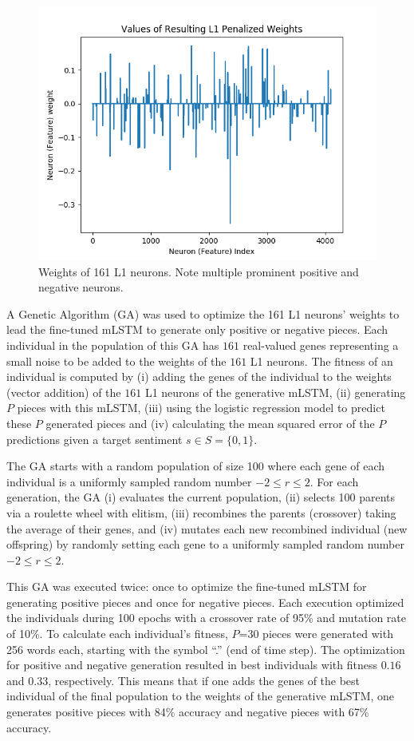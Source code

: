 \begin{figure}[!h]
 \centering
 \includegraphics[width=\columnwidth]{imgs/ismir19/weights.png}
 \caption{Weights of 161 L1 neurons. Note multiple prominent positive and negative neurons.}
 \label{fig:final_weights}
\end{figure}

A Genetic Algorithm (GA) was used to optimize the 161 L1 neurons' weights to lead the fine-tuned mLSTM to generate only positive or negative pieces. Each individual in the population of this GA has $161$ real-valued genes representing a small noise to be added to the weights of the $161$ L1 neurons. The fitness of an individual is computed by (i) adding the genes of the individual to the weights (vector addition) of the $161$ L1 neurons of the generative mLSTM, (ii) generating $P$ pieces with this mLSTM, (iii) using the logistic regression model to predict these $P$ generated pieces and (iv) calculating the mean squared error of the $P$ predictions given a target sentiment $s \in S = \{0, 1\}$.

The GA starts with a random population of size 100 where each gene of each individual is a uniformly sampled random number $-2 \leq r \leq 2$. For each generation, the GA (i) evaluates the current population, (ii) selects 100 parents via a roulette wheel with elitism, (iii) recombines the parents (crossover) taking the average of their genes, and (iv) mutates each new recombined individual (new offspring) by randomly setting each gene to a uniformly sampled random number $-2 \leq r \leq 2$.

This GA was executed twice: once to optimize the fine-tuned mLSTM for generating positive pieces and once for negative pieces. Each execution optimized the individuals during 100 epochs with a crossover rate of 95\% and mutation rate of 10\%. To calculate each individual's fitness, $P$=30 pieces were generated with 256 words each, starting with the symbol ``.'' (end of time step). The optimization for positive and negative generation resulted in best individuals with fitness $0.16$ and $0.33$, respectively. This means that if one adds the genes of the best individual of the final population to the weights of the generative mLSTM, one generates positive pieces with 84\% accuracy and negative pieces with 67\% accuracy.

